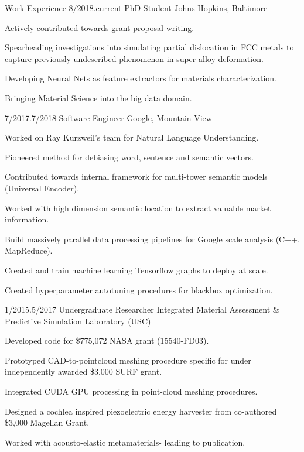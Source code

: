 \documentclass[letter,10pt]{dresume}
\begin{document}
\pagestyle{empty} %

\dheader

\begin{sblock}{Work Experience}
  \experience%
    {8/2018.}{current}%
    {PhD Student}%
    {Johns Hopkins, Baltimore}

    \item Actively contributed towards grant proposal writing.
    \item Spearheading investigations into simulating partial dislocation in FCC
      metals to capture previously undescribed phenomenon in super alloy
      deformation.
    \item Developing Neural Nets as feature extractors for materials
      characterization.
    \item Bringing Material Science into the big data domain.
  \endexperience

  \experience%
    {7/2017.}{7/2018}%
    {Software Engineer}%
    {Google, Mountain View}

    \item Worked on Ray Kurzweil's team for Natural Language Understanding.
    \item Pioneered method for debiasing word, sentence and semantic vectors.
    \item Contributed towards internal framework for multi-tower semantic models
      (Universal Encoder).
    \item Worked with high dimension semantic location to extract valuable
      market information.
    \item Build massively parallel data processing pipelines for Google scale
      analysis (C++, MapReduce).
    \item Created and train machine learning Tensorflow graphs to deploy at
      scale.
    \item Created hyperparameter autotuning procedures for blackbox
      optimization.
  \endexperience

  \experience%
    {1/2015.}{5/2017}%
    {Undergraduate Researcher}%
    {Integrated Material Assessment \& Predictive Simulation Laboratory (USC)}

    \item Developed code for \$775,072 NASA grant (15540-FD03).
    \item Prototyped CAD-to-pointcloud meshing procedure specific for under
      independently awarded \$3,000 SURF grant.
    \item Integrated CUDA GPU processing in point-cloud meshing procedures.
    \item Designed a cochlea inspired piezoelectric energy harvester from
      co-authored \$3,000 Magellan Grant.
    \item Worked with acousto-elastic metamaterials- leading to publication.
  \endexperience


\end{sblock}
\end{document}
